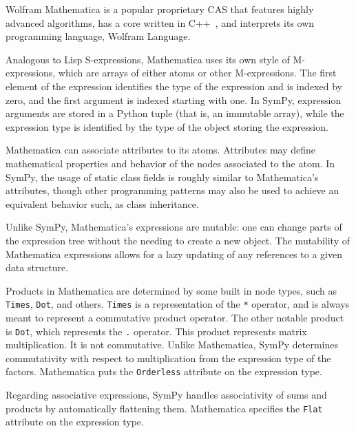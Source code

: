 Wolfram Mathematica is a popular proprietary CAS that
features highly advanced algorithms, has a core written in
C++~\cite{Wolfram2003book}, and interprets its own programming language,
Wolfram Language.


Analogous to Lisp S-expressions,
Mathematica uses its own style of M-expres\-sions,
which are arrays of either atoms or other M-expressions.
The first element of the expression identifies the type of the expression
and is indexed by zero, and the first argument is indexed starting with one.
In SymPy, expression arguments are stored in a Python tuple
(that is, an immutable array),
while the expression type is identified by the type of the object storing the
expression.


Mathematica can associate attributes to its atoms.
Attributes may define mathematical properties and behavior of the nodes
associated to the atom.
In SymPy, the usage of static class fields is roughly similar to Mathematica's
attributes, though other programming patterns may also be used to achieve an
equivalent behavior such, as class inheritance.


Unlike SymPy, Mathematica's expressions are mutable:
one can change parts of the expression tree without the needing to
create a new object.
The mutability of Mathematica expressions allows for a lazy updating of any references
to a given data structure.


Products in Mathematica are determined by some built in node types, such as
\texttt{Times}, \texttt{Dot}, and others.  \texttt{Times} is a representation of
the \texttt{*} operator, and is always meant to represent a commutative product
operator.  The other notable product is \texttt{Dot}, which represents the
\texttt{.} operator.  This product represents matrix multiplication. It is not
commutative.  Unlike
Mathematica, SymPy determines commutativity with respect to multiplication from
the expression type of the factors.  Mathematica puts the \texttt{Orderless} attribute
on the expression type.


Regarding associative expressions,
SymPy handles associativity of sums and products by automatically flattening them.
Mathematica specifies the \texttt{Flat} attribute on the expression type.

